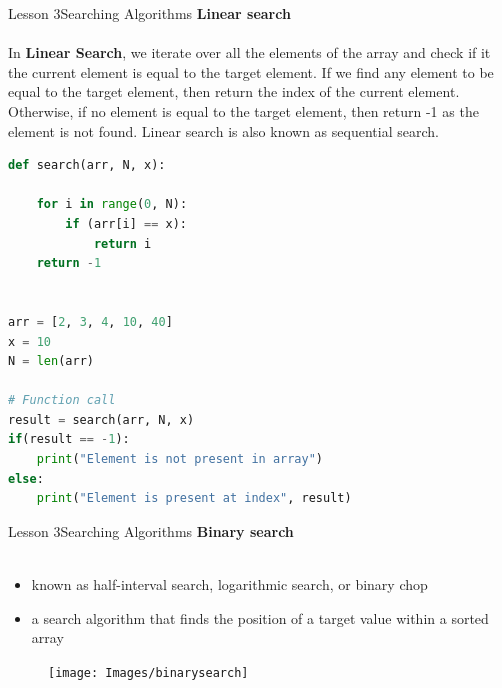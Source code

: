 \documentclass[aspectratio=1610]{beamer}
\begin{document}
\begin{frame}{Lesson 3}{Searching Algorithms}
\LARGE
\textbf{Linear search}\\~\\
In \textbf{Linear Search}, we iterate over all the elements of the array and check if it 
the current element is equal to the target element. If we find any element to be equal to 
the target element, then return the index of the current element. Otherwise, if no element 
is equal to the target element, then return -1 as the element is not found. Linear search
is also known as sequential search.
\end{frame}


\begin{frame}[fragile]
\begin{lstlisting}[language=Python]
def search(arr, N, x):

    for i in range(0, N):
        if (arr[i] == x):
            return i
    return -1


arr = [2, 3, 4, 10, 40]
x = 10
N = len(arr)

# Function call
result = search(arr, N, x)
if(result == -1):
    print("Element is not present in array")
else:
    print("Element is present at index", result)

\end{lstlisting}
\end{frame}





\begin{frame}{Lesson 3}{Searching Algorithms}
\LARGE
\textbf{Binary search}\\~\\
\begin{minipage}{0.65\textwidth}
\Large
\begin{itemize}
    \item known as half-interval search, logarithmic search, or binary chop
    \item a search algorithm that finds the position of a target value within a sorted array
 \end{itemize}
  \end{minipage}
\begin{minipage}{.0\textwidth}
      \begin{figure}
        \texttt{[image: Images/binarysearch]}
      \end{figure}
  \end{minipage}  
\end{frame}
\end{document}
